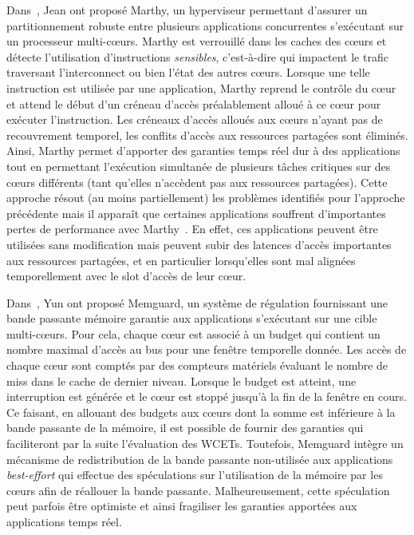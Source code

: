 \documentclass[main.tex]{subfiles}
\begin{document}
Dans~\cite{jean12}, Jean \etal ont proposé {\sc Marthy}, un hyperviseur permettant d'assurer un partitionnement robuste entre plusieurs applications concurrentes s'exécutant sur un processeur multi-c\oe{}urs. {\sc Marthy} est verrouillé dans les caches des c\oe{}urs et détecte l'utilisation d'instructions \emph{sensibles}, c'est-à-dire qui impactent le trafic traversant l'interconnect ou bien l'état des autres c\oe{}urs. Lorsque une telle instruction est utilisée par une application, {\sc Marthy} reprend le contrôle du c\oe{}ur et attend le début d'un créneau d'accès préalablement alloué à ce c\oe{}ur pour exécuter l'instruction. Les créneaux d'accès alloués aux c\oe{}urs n'ayant pas de recouvrement temporel, les conflits d'accès aux ressources partagées sont éliminés. Ainsi, {\sc Marthy} permet d'apporter des garanties temps réel dur à des applications tout en permettant l'exécution simultanée de plusieurs tâches critiques sur des c\oe{}urs différents (tant qu'elles n'accèdent pas aux ressources partagées). Cette approche résout (au moins partiellement) les problèmes identifiés pour l'approche précédente mais il apparaît que certaines applications souffrent d'importantes pertes de performance avec {\sc Marthy}~\cite{Jean2015}. En effet, ces applications peuvent être utilisées sans modification mais peuvent subir des latences d'accès importantes aux ressources partagées, et en particulier lorsqu'elles sont mal alignées temporellement avec le slot d'accès de leur c\oe{}ur.

Dans~\cite{Yun2013}, Yun \etal ont proposé Memguard, un système de régulation fournissant une bande passante mémoire garantie aux applications s'exécutant sur une cible multi-c\oe{}urs. Pour cela, chaque c\oe{}ur est associé à un budget qui contient un nombre maximal d'accès au bus pour une fenêtre temporelle donnée. Les accès de chaque c\oe{}ur sont comptés par des compteurs matériels évaluant le nombre de miss dans le cache de dernier niveau. Lorsque le budget est atteint, une interruption est générée et le c\oe{}ur est stoppé jusqu'à la fin de la fenêtre en cours. Ce faisant, en allouant des budgets aux c\oe{}urs dont la somme est inférieure à la bande passante de la mémoire, il est possible de fournir des garanties qui faciliteront par la suite l'évaluation des WCETs. Toutefois, Memguard intègre un mécanisme de redistribution de la bande passante non-utilisée aux applications \emph{best-effort} qui effectue des spéculations sur l'utilisation de la mémoire par les c\oe{}urs afin de réallouer la bande passante. Malheureusement, cette spéculation peut parfois être optimiste et ainsi fragiliser les garanties apportées aux applications temps réel. \\
\end{document}
